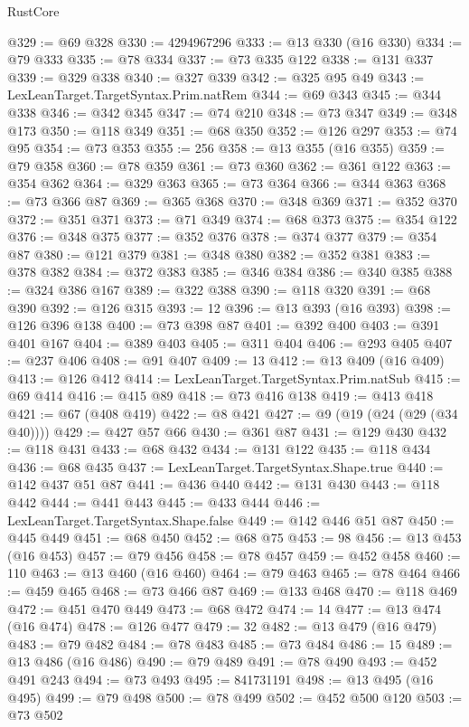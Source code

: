 \begin{lexlean}{RustCore}
\begin{coremodule}
@329 := @69 @328
@330 := 4294967296
@333 := @13 @330 (@16 @330)
@334 := @79 @333
@335 := @78 @334
@337 := @73 @335 @122
@338 := @131 @337
@339 := @329 @338
@340 := @327 @339
@342 := @325 @95 @49
@343 := LexLeanTarget.TargetSyntax.Prim.natRem
@344 := @69 @343
@345 := @344 @338
@346 := @342 @345
@347 := @74 @210
@348 := @73 @347
@349 := @348 @173
@350 := @118 @349
@351 := @68 @350
@352 := @126 @297
@353 := @74 @95
@354 := @73 @353
@355 := 256
@358 := @13 @355 (@16 @355)
@359 := @79 @358
@360 := @78 @359
@361 := @73 @360
@362 := @361 @122
@363 := @354 @362
@364 := @329 @363
@365 := @73 @364
@366 := @344 @363
@368 := @73 @366 @87
@369 := @365 @368
@370 := @348 @369
@371 := @352 @370
@372 := @351 @371
@373 := @71 @349
@374 := @68 @373
@375 := @354 @122
@376 := @348 @375
@377 := @352 @376
@378 := @374 @377
@379 := @354 @87
@380 := @121 @379
@381 := @348 @380
@382 := @352 @381
@383 := @378 @382
@384 := @372 @383
@385 := @346 @384
@386 := @340 @385
@388 := @324 @386 @167
@389 := @322 @388
@390 := @118 @320
@391 := @68 @390
@392 := @126 @315
@393 := 12
@396 := @13 @393 (@16 @393)
@398 := @126 @396 @138
@400 := @73 @398 @87
@401 := @392 @400
@403 := @391 @401 @167
@404 := @389 @403
@405 := @311 @404
@406 := @293 @405
@407 := @237 @406
@408 := @91 @407
@409 := 13
@412 := @13 @409 (@16 @409)
@413 := @126 @412
@414 := LexLeanTarget.TargetSyntax.Prim.natSub
@415 := @69 @414
@416 := @415 @89
@418 := @73 @416 @138
@419 := @413 @418
@421 := @67 (@408 @419)
@422 := @8 @421
@427 := @9 (@19 (@24 (@29 (@34 @40))))
@429 := @427 @57 @66
@430 := @361 @87
@431 := @129 @430
@432 := @118 @431
@433 := @68 @432
@434 := @131 @122
@435 := @118 @434
@436 := @68 @435
@437 := LexLeanTarget.TargetSyntax.Shape.true
@440 := @142 @437 @51 @87
@441 := @436 @440
@442 := @131 @430
@443 := @118 @442
@444 := @441 @443
@445 := @433 @444
@446 := LexLeanTarget.TargetSyntax.Shape.false
@449 := @142 @446 @51 @87
@450 := @445 @449
@451 := @68 @450
@452 := @68 @75
@453 := 98
@456 := @13 @453 (@16 @453)
@457 := @79 @456
@458 := @78 @457
@459 := @452 @458
@460 := 110
@463 := @13 @460 (@16 @460)
@464 := @79 @463
@465 := @78 @464
@466 := @459 @465
@468 := @73 @466 @87
@469 := @133 @468
@470 := @118 @469
@472 := @451 @470 @449
@473 := @68 @472
@474 := 14
@477 := @13 @474 (@16 @474)
@478 := @126 @477
@479 := 32
@482 := @13 @479 (@16 @479)
@483 := @79 @482
@484 := @78 @483
@485 := @73 @484
@486 := 15
@489 := @13 @486 (@16 @486)
@490 := @79 @489
@491 := @78 @490
@493 := @452 @491 @243
@494 := @73 @493
@495 := 841731191
@498 := @13 @495 (@16 @495)
@499 := @79 @498
@500 := @78 @499
@502 := @452 @500 @120
@503 := @73 @502

\end{coremodule}
\end{lexlean}
